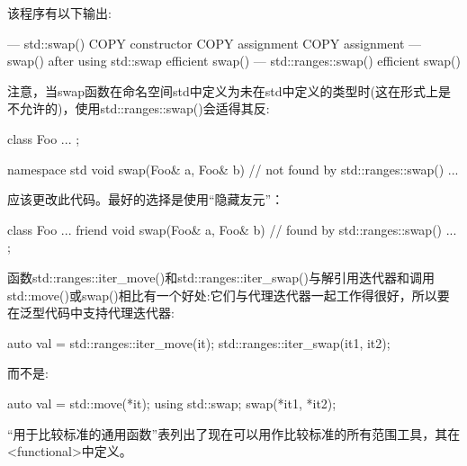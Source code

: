 该程序有以下输出:

\begin{shell}
--- std::swap()
COPY constructor
COPY assignment
COPY assignment
--- swap() after using std::swap
efficient swap()
--- std::ranges::swap()
efficient swap()
\end{shell}

注意，当swap函数在命名空间std中定义为未在std中定义的类型时(这在形式上是不允许的)，使用std::ranges::swap()会适得其反:

\begin{cpp}
class Foo {
	...
};

namespace std {
	void swap(Foo& a, Foo& b) { // not found by std::ranges::swap()
		...
	}
}
\end{cpp}

应该更改此代码。最好的选择是使用“隐藏友元”：

\begin{cpp}
class Foo {
	...
	friend void swap(Foo& a, Foo& b) { // found by std::ranges::swap()
		...
	}
};
\end{cpp}

函数std::ranges::iter\_move()和std::ranges::iter\_swap()与解引用迭代器和调用std::move()或swap()相比有一个好处:它们与代理迭代器一起工作得很好，所以要在泛型代码中支持代理迭代器:

\begin{cpp}
auto val = std::ranges::iter_move(it);
std::ranges::iter_swap(it1, it2);
\end{cpp}

而不是:

\begin{cpp}
auto val = std::move(*it);
using std::swap;
swap(*it1, *it2);
\end{cpp}


“用于比较标准的通用函数”表列出了现在可以用作比较标准的所有范围工具，其在<functional>中定义。


